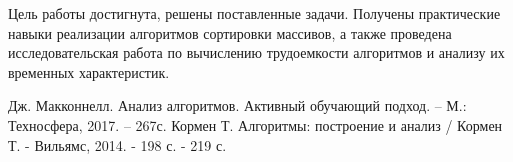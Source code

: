 \documentclass[12pt,a4paper]{report}
\begin{document}
Цель работы достигнута, решены поставленные задачи.
Получены практические навыки реализации алгоритмов сортировки массивов, а также проведена 
исследовательская работа по вычислению трудоемкости алгоритмов и анализу их временных характеристик.

\newpage
\renewcommand\bibname{Список литературы}
\makeatletter %
\def\@biblabel#1{#1. }
\makeatother
\begin{thebibliography}{2}
     Дж. Макконнелл. Анализ алгоритмов. Активный обучающий подход. -- М.: Техносфера, 2017. -- 267с.
     Кормен Т. Алгоритмы: построение и анализ / Кормен Т. - Вильямс, 2014. - 198 с. - 219 с.
\end{thebibliography}
\end{document}
